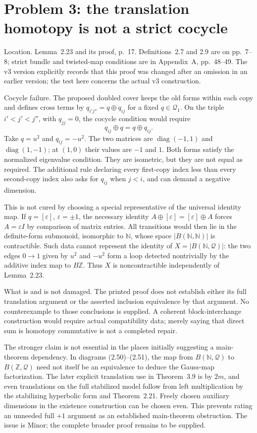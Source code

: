 \documentclass[10pt]{article}
\begin{document}
\section*{Problem 3: the translation homotopy is not a strict cocycle}
Location. Lemma 2.23 and its proof, p. 17. Definitions 2.7 and 2.9 are on pp. 7–8; strict bundle and twisted-map conditions are in Appendix A, pp. 48–49. The v3 version explicitly records that this proof was changed after an omission in an earlier version; the test here concerns the actual v3 construction.\par
Cocycle failure. The proposed doubled cover keeps the old forms within each copy and defines cross terms by \(q_{i'j''}=q\oplus q_{ij}\) for a fixed \(q\in\mathcal Q_1\). On the triple \(i'<j'<j''\), with \(q_{jj}=0\), the cocycle condition would require \[q_{ij}\oplus q=q\oplus q_{ij}.\] Take \(q=u^2\) and \(q_{ij}=-u^2\). The two matrices are \(\operatorname{diag}(-1,1)\) and \(\operatorname{diag}(1,-1)\); at \((1,0)\) their values are \(-1\) and \(1\). Both forms satisfy the normalized eigenvalue condition. They are isometric, but they are not equal as required. The additional rule declaring every first-copy index less than every second-copy index also asks for \(q_{ij}\) when \(j<i\), and can demand a negative dimension.\par
This is not cured by choosing a special representative of the universal identity map. If \(q=[\varepsilon]\), \(\varepsilon=\pm1\), the necessary identity \(A\oplus[\varepsilon]=[\varepsilon]\oplus A\) forces \(A=\varepsilon I\) by comparison of matrix entries. All transitions would then lie in the definite-form submonoid, isomorphic to \(\mathbb N\), whose space \(|B(\mathbb N,\mathbb N)|\) is contractible. Such data cannot represent the identity of \(X=|B(\mathbb N,\mathcal Q)|\): the two edges \(0\to1\) given by \(u^2\) and \(-u^2\) form a loop detected nontrivially by the additive index map to \(B\mathbb Z\). Thus \(X\) is noncontractible independently of Lemma 2.23.\par
What is and is not damaged. The printed proof does not establish either its full translation argument or the asserted inclusion equivalence by that argument. No counterexample to those conclusions is supplied. A coherent block-interchange construction would require actual compatibility data; merely saying that direct sum is homotopy commutative is not a completed repair.\par
The stronger claim is not essential in the places initially suggesting a main-theorem dependency. In diagrams (2.50)–(2.51), the map from \(B(\mathbb N,\mathcal Q)\) to \(B(\mathbb Z,\mathcal Q)\) need not itself be an equivalence to deduce the Gauss-map factorization. The later explicit translation use in Theorem 3.9 is by \(2m\), and even translations on the full stabilized model follow from left multiplication by the stabilizing hyperbolic form and Theorem 2.21. Freely chosen auxiliary dimensions in the existence construction can be chosen even. This prevents rating an unneeded full \(+1\) argument as an established main-theorem obstruction. The issue is Minor; the complete broader proof remains to be supplied.\par
\end{document}
